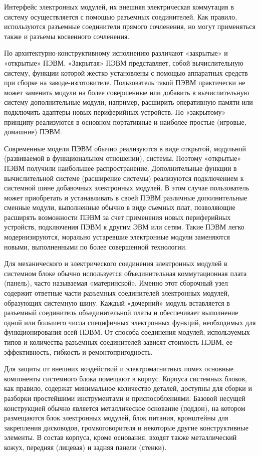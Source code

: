 \documentclass[unicode, 12pt, a4paper, oneside]{article}
\begin{document}
Интерфейс электронных модулей, их внешняя электрическая коммутация в систему осуществляется с помощью разъемных соединителей. Как правило, используются разъемные соединители прямого сочленения, но могут применяться также и разъемы косвенного сочленения.

По архитектурно-конструктивному исполнению различают «закрытые» и «открытые» ПЭВМ. «Закрытая» ПЭВМ представляет, собой вычислительную систему, функции которой жестко установлены с помощью аппаратных средств при сборке на заводе-изготовителе. Пользователь такой ПЭВМ практически не может заменить модули на более совершенные или добавить в вычислительную систему дополнительные модули, например, расширить оперативную памяти или подключить адаптеры новых периферийных устройств. По «закрытому» принципу реализуются в основном портативные и наиболее простые (игровые, домашние) ПЭВМ.

Современные модели ПЭВМ обычно реализуются в виде открытой, модульной (развиваемой в функциональном отношении), системы. Поэтому «открытые» ПЭВМ получили наибольшее распространение. Дополнительные функции в вычислительной системе (расширение системы) реализуются подключением к системной шине добавочных электронных модулей. В этом случае пользователь может приобретать и устанавливать в своей ПЭВМ различные дополнительные сменные модули, выполненные обычно в виде съемных плат, позволяющие расширять возможности ПЭВМ за счет применения новых периферийных устройств, подключения ПЭВМ к другим ЭВМ или сетям. Такие ПЭВМ легко модернизируются, морально устаревшие электронные модули заменяются новыми, выполненными по более совершенной технологии.

Для механического и электрического соединения электронных модулей в системном блоке обычно используется объединительная коммутационная плата (панель), часто называемая «материнской». Именно этот сборочный узел содержит ответные части разъемных соединителей электронных модулей, образующих системную шину. Каждый «дочерний» модуль вставляется в разъемный соединитель объединительной платы и обеспечивает выполнение одной или большего числа специфичных электронных функций, необходимых для функционирования всей ПЭВМ. От способа соединения модулей, используемых типов и количества разъемных соединителей зависят стоимость ПЭВМ, ее эффективность, гибкость и ремонтопригодность.

Для защиты от внешних воздействий и электромагнитных помех основные компоненты системного блока помещают в корпус. Корпуса системных блоков, как правило, содержат минимальное количество деталей, доступны для сборки и разборки простейшими инструментами и приспособлениями. Базовой несущей конструкцией обычно является металлическое основание (поддон), на котором размещаются блок электронных модулей, блок питания, кронштейны для закрепления дисководов, громкоговорителя и некоторые другие конструктивные элементы. В состав корпуса, кроме основания, входят также металлический кожух, передняя (лицевая) и задняя панели (стенки).
\end{document}
